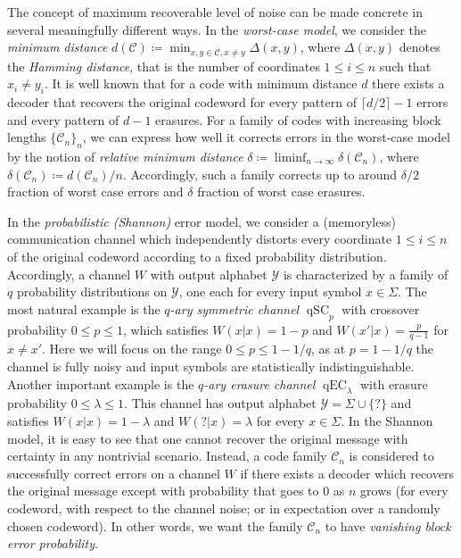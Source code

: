 \documentclass{article}
\DeclareMathOperator{\qSC}{qSC}
\DeclareMathOperator{\qEC}{qEC}
\newcommand{\cC}{\mathcal{C}}
\theoremstyle{plain}
\theoremstyle{plain}
\theoremstyle{plain}
\theoremstyle{plain}
\theoremstyle{plain}
\theoremstyle{plain}
\theoremstyle{plain}
\theoremstyle{plain}
\theoremstyle{plain}
\theoremstyle{plain}
\theoremstyle{remark}
\theoremstyle{remark}
\theoremstyle{remark}
\theoremstyle{plain}
\begin{document}
The concept of maximum recoverable level of noise can
be made concrete in several meaningfully different ways.
In the \emph{worst-case model}, we consider the \emph{minimum
distance} $d(\cC)\coloneqq \min_{x,y\in\cC, x\ne y} \Delta(x,y)$,
where $\Delta(x,y)$ denotes the \emph{Hamming distance}, that is
the number of coordinates $1\le i\le n$ such that $x_i\ne y_i$.
It is well known that for a code with minimum distance $d$ 
there exists a decoder that recovers the original codeword
for every pattern of $\lceil d/2\rceil-1$ errors and
every pattern of $d-1$ erasures. For a family
of codes with increasing block lengths $\{\cC_n\}_n$,
we can express how well it corrects errors
in the worst-case model by the notion of
\emph{relative minimum distance} 
$\delta\coloneqq \liminf_{n\to\infty}\delta(\cC_n)$,
where $\delta(\cC_n)\coloneqq d(\cC_n)/n$.
Accordingly, such a family corrects up to around
$\delta/2$ fraction of worst case errors
and $\delta$ fraction of worst case erasures.

In the \emph{probabilistic (Shannon)} error model,
we consider a (memoryless) communication channel
which independently distorts every coordinate $1\le i\le n$ of the original codeword according to a fixed probability 
distribution. Accordingly, a channel $W$ with output
alphabet $\mathcal{Y}$ is characterized
by a family of $q$ probability distributions on $\mathcal{Y}$,
one each for every input symbol $x\in\Sigma$.
The most natural example 
is the \emph{$q$-ary symmetric
channel} $\qSC_{p}$ with crossover probability
$0\le p\le 1$, which satisfies $W(x|x)=1-p$
and $W(x'|x)=\frac{p}{q-1}$ for $x\ne x'$.
Here we will focus on
the range $0\le p\le 1-1/q$, as at $p=1-1/q$
the channel is fully noisy and input symbols are statistically indistinguishable.
Another important example is the \emph{$q$-ary erasure
channel} $\qEC_\lambda$ with erasure probability $0\le\lambda\le 1$. This channel has output alphabet $\mathcal{Y}=\Sigma\cup\{?\}$ and satisfies
$W(x|x)=1-\lambda$ and $W(?|x)=\lambda$ for every $x\in\Sigma$.
In the Shannon model, it is easy to see that one cannot
recover the original message with certainty in any nontrivial scenario. Instead, a code
family $\cC_n$ 
is considered to successfully correct errors on a channel $W$ if
there exists a decoder which recovers the original message
except with probability that goes to $0$ as $n$ grows
(for every codeword, with respect to the channel noise;
or in expectation over a randomly chosen codeword).
In other words, we want the family $\cC_n$ to
have \emph{vanishing block error probability}.
\end{document}
